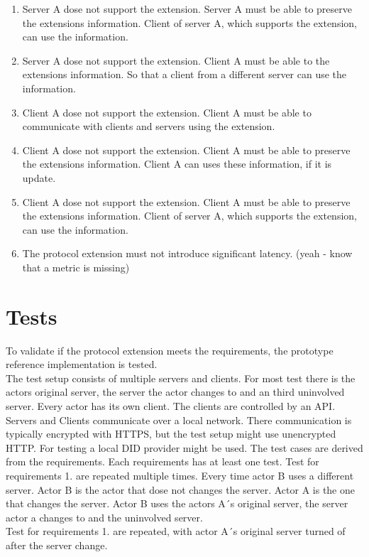 \documentclass[conference]{IEEEtran}
\begin{document}
\begin{enumerate}
{\begin{enumerate}
            \item {Server A dose not support the extension. Server A must be able to preserve the extensions information. Client of server A, which supports the extension, can use the information.}
            \item {Server A dose not support the extension. Client A must be able to the extensions information. So that a client from a different server can use the information.}
            \item {Client A dose not support the extension. Client A must be able to communicate with clients and servers using the extension.}
            \item {Client A dose not support the extension. Client A must be able to preserve the extensions information. Client A can uses these information, if it is update.}
            \item {Client A dose not support the extension. Client A must be able to preserve the extensions information. Client of server A, which supports the extension, can use the information.}
            \item {The protocol extension must not introduce significant latency. (yeah - know that a metric is missing)}
         \end{enumerate}
    }
\end{enumerate}
\section{Tests}
To validate if the protocol extension meets the requirements, the prototype reference implementation is tested.\\
The test setup consists of multiple servers and clients. For most test there is the actors original server, the server the actor changes to and an third uninvolved server. Every actor has its own client. The clients are controlled by an API. \\
Servers and Clients communicate over a local network. There communication is typically encrypted with HTTPS, but the test setup might use unencrypted HTTP. For testing a local DID provider might be used.
The test cases are derived from the requirements. Each requirements has at least one test. Test for requirements 1. are repeated multiple times. Every time actor B uses a different server. Actor B is the actor that dose not changes the server. Actor A is the one that changes the server. Actor B uses the actors A´s original server, the server actor a changes to and the uninvolved server.\\
Test for requirements 1. are repeated, with actor A´s original server turned of after the server change.
\end{document}
